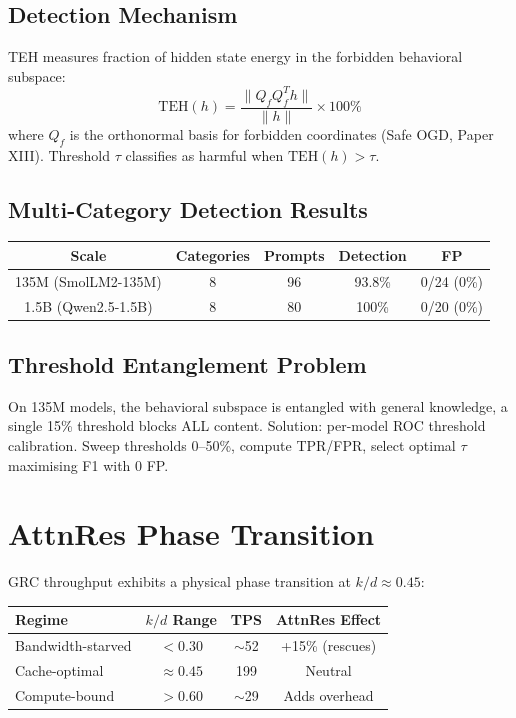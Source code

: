 \documentclass[11pt]{article}
\begin{document}
\subsection{Detection Mechanism}
TEH measures fraction of hidden state energy in the forbidden behavioral subspace:
\begin{equation}
\mathrm{TEH}(h) = \frac{\|Q_f Q_f^T h\|}{\|h\|} \times 100\%
\end{equation}
where $Q_f$ is the orthonormal basis for forbidden coordinates (Safe OGD, Paper XIII). Threshold $\tau$ classifies as harmful when $\mathrm{TEH}(h) > \tau$.

\subsection{Multi-Category Detection Results}

\begin{table}[h]\centering
\begin{tabular}{ccccc}\toprule
Scale & Categories & Prompts & Detection & FP \\\midrule
135M (SmolLM2-135M) & 8 & 96 & 93.8\% & 0/24 (0\%) \\
1.5B (Qwen2.5-1.5B) & 8 & 80 & 100\% & 0/20 (0\%) \\\bottomrule
\end{tabular}
\end{table}

\subsection{Threshold Entanglement Problem}
On 135M models, the behavioral subspace is entangled with general knowledge, a single 15\% threshold blocks ALL content. Solution: per-model ROC threshold calibration. Sweep thresholds 0--50\%, compute TPR/FPR, select optimal $\tau$ maximising F1 with 0 FP.


\section{AttnRes Phase Transition}

GRC throughput exhibits a physical phase transition at $k/d \approx 0.45$:

\begin{table}[h]\centering
\begin{tabular}{lccc}\toprule
Regime & $k/d$ Range & TPS & AttnRes Effect \\\midrule
Bandwidth-starved & $<0.30$ & $\sim$52 & +15\% (rescues) \\
Cache-optimal & $\approx 0.45$ & 199 & Neutral \\
Compute-bound & $>0.60$ & $\sim$29 & Adds overhead \\\bottomrule
\end{tabular}
\end{table}
\end{document}
